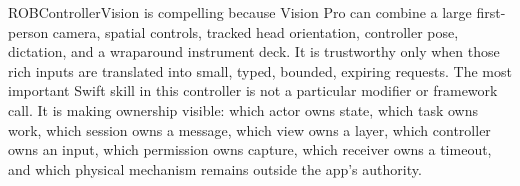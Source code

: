 {}
\markdownRendererSectionEnd \markdownRendererSectionBegin
{}\markdownRendererInterblockSeparator
{}ROBControllerVision is compelling because Vision Pro can combine a large first-person camera, spatial controls, tracked head orientation, controller pose, dictation, and a wraparound instrument deck. It is trustworthy only when those rich inputs are translated into small, typed, bounded, expiring requests.\markdownRendererParagraphSeparator
{}The most important Swift skill in this controller is not a particular modifier or framework call. It is making ownership visible: which actor owns state, which task owns work, which session owns a message, which view owns a layer, which controller owns an input, which permission owns capture, which receiver owns a timeout, and which physical mechanism remains outside the app's authority.
\markdownRendererSectionEnd \markdownRendererDocumentEnd